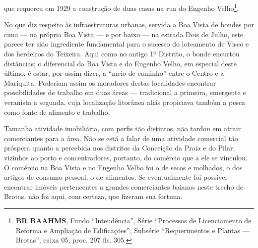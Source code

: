que requereu em 1929 a construção de duas casas na rua do Engenho Velho\footnote{\textbf{BR BAAHMS}, Fundo ``Intendência'', Série ``Processos de Licenciamento de Reforma e Ampliação de Edificações'', Subsérie ``Requerimentos e Plantas --- Brotas'', caixa 05, proc. 297 fls. 305.}.





No que diz respeito às infraestruturas urbanas, servida a Boa Vista de bondes por cima --- na própria Boa Vista --- e por baixo --- na estrada Dois de Julho, este parece ter sido ingrediente fundamental para o sucesso do loteamento de Visco e dos herdeiros do Teixeira. Aqui como no antigo 1º Distrito, o bonde encurtou distâncias; o diferencial da Boa Vista e do Engenho Velho, em especial deste último, é estar, por assim dizer, a ``meio de caminho'' entre o Centro e a Mariquita. Poderiam assim os moradores destas localidades encontrar possibilidades de trabalho em duas áreas --- tradicional a primeira, emergente e veranista a segunda, cuja localização litorânea aliás propiciava também a pesca como fonte de alimento e trabalho.


Tamanha atividade imobiliária, com perfis tão distintos, não tardou em atrair comerciantes para a área. Não se está a falar de uma atividade comercial tão próspera quanto a percebida nos distritos da Conceição da Praia e do Pilar, vizinhos ao porto e concentradores, portanto, do comércio que a ele se vinculou. O comércio na Boa Vista e no Engenho Velho foi o de secos e molhados, o dos artigos de consumo pessoal, o de alimentos. Se eventualmente foi possível encontrar imóveis pertencentes a grandes comerciantes baianos neste trecho de Brotas, não foi aqui, com certeza, que fizeram sua fortuna.

